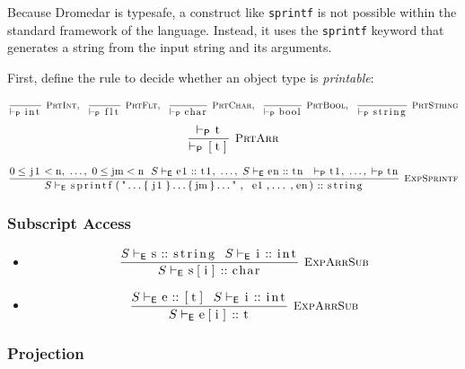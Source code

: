 \documentclass{article}
\newcommand{\code}[1]{\lstinline[columns=fixed]{#1}}
\newcommand{\drmrule}[5]{\frac{#1}{#2\vdash_{\mathsf{#3}}#4}\textsc{\ \small{#5}}}
\newcommand{\ruleapp}[1]{\vdash_{\mathsf{#1}}}
\newcommand{\mc}[1]{\textnormal{\code{#1}}}
\begin{document}
				Because Dromedar is typesafe, a construct like \code{sprintf} is not possible within the standard framework of the language. Instead, it uses the \code{sprintf} keyword that generates a string from the input string and its arguments.
				
				First, define the rule to decide whether an object type is \textit{printable}:
				
				\begin{align*}
					\drmrule{}{}{P}{\mc{int}}{PrtInt},\ \ 
					\drmrule{}{}{P}{\mc{flt}}{PrtFlt},\ \ 
					\drmrule{}{}{P}{\mc{char}}{PrtChar},\ \ 
					\drmrule{}{}{P}{\mc{bool}}{PrtBool},\ \ 
					\drmrule{}{}{P}{\mc{string}}{PrtString}
				\end{align*}\begin{align*}
					\drmrule{\ruleapp{P}\mc{t}}{}{P}{\mc{[t]}}{PrtArr}
				\end{align*}
				
				\begin{align*}
					\drmrule{0\leq\mc{j1}<\mc{n},\ \dots,\ 0\leq\mc{jm}<\mc{n}\ \ S\ruleapp{E}\mc{e1}::\mc{t1},\ \dots,\ S\ruleapp{E}\mc{en}::\mc{tn}\ \ \ruleapp{P}\mc{t1},\ \dots,\ \ruleapp{P}\mc{tn}}{S}{E}{\mc{sprintf("...\{j1\}...\{jm\}...", e1,...,en)} :: \mc{string}}{ExpSprintf}
				\end{align*}
				
			\subsubsection{Subscript Access}
			
				\begin{itemize}
					\item
						\begin{align*}
							\drmrule{S\ruleapp{E}\mc{s}::\mc{string}\ \ S\ruleapp{E}\mc{i}::\mc{int}}{S}{E}{\mc{s[i]} :: \mc{char}}{ExpArrSub}
						\end{align*}
					\item
						\begin{align*}
							\drmrule{S\ruleapp{E}\mc{e}::\mc{[t]}\ \ S\ruleapp{E}\mc{i}::\mc{int}}{S}{E}{\mc{e[i]} :: \mc{t}}{ExpArrSub}
						\end{align*}
				\end{itemize}
			
			\subsubsection{Projection}
			
\end{document}
